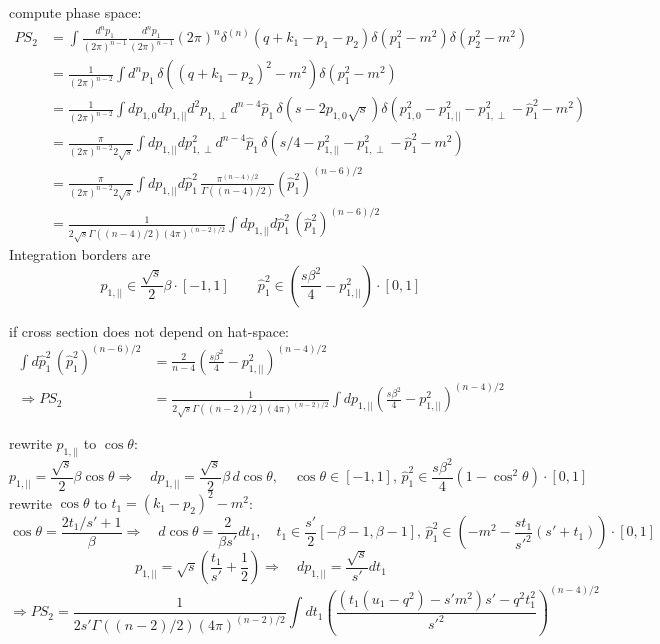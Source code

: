 \documentclass[
  ngerman,		%
  a4paper,		%
  11pt,			%
  DIV=12,		%
  parskip=half  	%
]{scrartcl}
\begin{document}
compute phase space:
\begin{align}
PS_2 &= \int\!\!\frac{d^np_1}{(2\pi)^{n-1}}\frac{d^np_1}{(2\pi)^{n-1}} (2\pi)^n\delta^{(n)}(q+k_1-p_1-p_2)\delta(p_1^2-m^2)\delta(p_2^2 - m^2)\\
 &= \frac 1 {(2\pi)^{n-2}}\int\!\!d^np_1\,\delta((q+k_1-p_2)^2 -m^2) \delta(p_1^2-m^2)\\
 &= \frac 1 {(2\pi)^{n-2}}\int\!\!dp_{1,0}dp_{1,||}d^2p_{1,\perp}d^{n-4}\hat p_1\,\delta(s-2p_{1,0}\sqrt s) \delta(p_{1,0}^2-p_{1,||}^2 - p_{1,\perp}^2 - \hat p_1^2-m^2)\\
 &= \frac \pi {(2\pi)^{n-2} 2\sqrt s}\int\!\!dp_{1,||}dp^2_{1,\perp}d^{n-4}\hat p_1\,\delta(s/4-p_{1,||}^2 - p_{1,\perp}^2 - \hat p_1^2-m^2)\\
 &= \frac \pi {(2\pi)^{n-2} 2\sqrt s}\int\!\!dp_{1,||}d\hat p_1^2\,\frac{\pi^{(n-4)/2}}{\Gamma((n-4)/2)}(\hat p_1^2)^{(n-6)/2}\\
 &= \frac 1 {2\sqrt s\Gamma((n-4)/2)(4\pi)^{(n-2)/2}}\int\!\!dp_{1,||}d\hat p_1^2\,(\hat p_1^2)^{(n-6)/2}
\end{align}
Integration borders are
\begin{equation}
p_{1,||} \in \frac {\sqrt s} 2\beta \cdot [-1,1] \qquad \hat p_1^2 \in \left(\frac{s \beta^2}{4}-p_{1,||}^2\right)\cdot [0,1]
\end{equation}

if cross section does not depend on hat-space:
\begin{align}
\int\!\!d\hat p_1^2\,(\hat p_1^2)^{(n-6)/2} &= \frac 2 {n-4}\left(\frac{s \beta^2}{4}-p_{1,||}^2\right)^{(n-4)/2}\\
\Rightarrow PS_2 &= \frac 1 {2\sqrt s\Gamma((n-2)/2)(4\pi)^{(n-2)/2}}\int\!\!dp_{1,||}\left(\frac{s \beta^2}{4}-p_{1,||}^2\right)^{(n-4)/2}
\end{align}

rewrite $p_{1,||}$ to $\cos\theta$:
\begin{equation}
p_{1,||} = \frac{\sqrt s} 2 \beta\cos\theta \Rightarrow\quad dp_{1,||} = \frac{\sqrt s} 2 \beta\,d\!\cos\theta,\quad \cos\theta\in[-1,1],\, \hat p_1^2 \in \frac{s \beta^2}{4}\left(1-\cos^2\theta\right)\cdot[0,1]
\end{equation}
rewrite $\cos\theta$ to $t_1 = (k_1-p_2)^2-m^2$:
\begin{equation}
\cos\theta = \frac{2t_1/s'+1}{\beta} \Rightarrow\quad d\!\cos\theta = \frac 2 {\beta s'} dt_1,\quad t_1\in \frac {s'} 2[-\beta -1,\beta -1],\, \hat p_1^2 \in (-m^2-\frac{st_1}{s'^2}(s'+t_1))\cdot[0,1]
\end{equation}
\begin{equation}
p_{1,||} = \sqrt s\left(\frac{t_1}{s'}+\frac{1} 2\right) \Rightarrow\quad  dp_{1,||} = \frac{\sqrt s}{s'} dt_1
\end{equation}
\begin{equation}
\Rightarrow PS_2 = \frac 1 {2s'\Gamma((n-2)/2)(4\pi)^{(n-2)/2}}\int\!\!dt_1\left(\frac{(t_1(u_1-q^2)-s'm^2)s' - q^2t_1^2}{s'^2}\right)^{(n-4)/2}
\end{equation}
\end{document}
